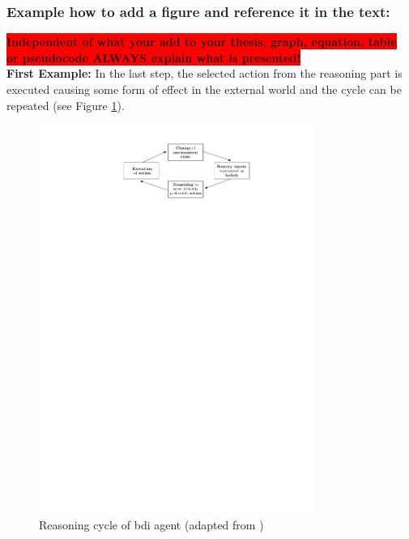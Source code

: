  
\subsubsection{Example how to add a figure and reference it in the text:}

\colorbox{red}{\textbf{Independent of what your add to your thesis, graph, equation, table}} \\
\colorbox{red}{\textbf{or pseudocode ALWAYS explain what is presented!}}
\\
 
\textbf{First Example:}
In the last step, the selected action from the reasoning part is executed causing some form of effect in the external world and the cycle can be repeated (see Figure \ref{reasoning}).

\begin{figure}[H]
	\centering
  \includegraphics[width=0.8\textwidth]{figures/reason_cycl.pdf}
	\caption{Reasoning cycle of \gls{bdi} agent (adapted from \cite{bremner2019})}
	\label{reasoning}
\end{figure} 


